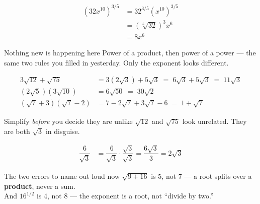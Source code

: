 \documentclass[aspectratio=169, 11pt]{beamer}
\begin{document}
\begin{frame}[t, plain]
  \[
  \begin{aligned}
    \left(32x^{10}\right)^{3/5} &= 32^{3/5}\left(x^{10}\right)^{3/5} \\
                                &= \left(\sqrt[5]{32}\right)^3 x^{6} \\
                                &= 8x^6
  \end{aligned}
  \]
  \begin{block}{Nothing new is happening here}
    Power of a product, then power of a power --- the same two rules you filled in yesterday.
    Only the exponent looks different.
  \end{block}
\end{frame}

\begin{frame}[t, plain]
  \[
  \begin{aligned}
    3\sqrt{12}+\sqrt{75} &= 3\left(2\sqrt3\right)+5\sqrt3 \;=\; 6\sqrt3+5\sqrt3 \;=\; 11\sqrt3 \\[4pt]
    \left(2\sqrt5\right)\left(3\sqrt{10}\right) &= 6\sqrt{50} \;=\; 30\sqrt2 \\[4pt]
    \left(\sqrt7+3\right)\left(\sqrt7-2\right)  &= 7-2\sqrt7+3\sqrt7-6 \;=\; 1+\sqrt7
  \end{aligned}
  \]
  \begin{block}{Simplify \emph{before} you decide they are unlike}
    $\sqrt{12}$ and $\sqrt{75}$ look unrelated. They are both $\sqrt3$ in disguise.
  \end{block}
\end{frame}

\begin{frame}[t, plain]
  \[
  \begin{aligned}
    \dfrac{6}{\sqrt3} &= \dfrac{6}{\sqrt3}\cdot\dfrac{\sqrt3}{\sqrt3}
                       = \dfrac{6\sqrt3}{3} = 2\sqrt3
  \end{aligned}
  \]
  \begin{block}{The two errors to name out loud now}
    $\sqrt{9+16}$ is $5$, not $7$ --- a root splits over a \textbf{product}, never a sum.\\[2pt]
    And $16^{1/2}$ is $4$, not $8$ --- the exponent is a root, not ``divide by two.''
  \end{block}
\end{frame}
\end{document}
